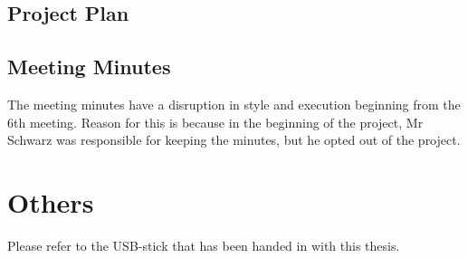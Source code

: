 \documentclass[10pt,a4paper,titlepage,twoside,english,final]{zhawreprt}
\begin{document}
\subsection{Project Plan}\label{ssec:ProjectPlan}


\subsection{Meeting Minutes}\label{ssec:MeetingMinutes}
The meeting minutes have a disruption in style and execution beginning from the 6th meeting.
Reason for this is because in the beginning of the project, Mr Schwarz was responsible for keeping the minutes, but he opted out of the project.












\section{Others}\label{sec:Others}
Please refer to the USB-stick that has been handed in with this thesis.
\end{document}
